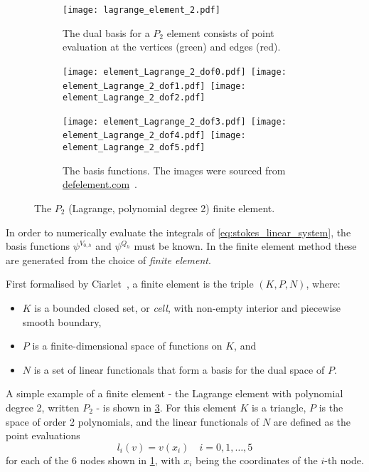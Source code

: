 \documentclass[thesis]{subfiles}
\begin{document}
\begin{figure}
  \centering
  \begin{subfigure}[b]{.4\textwidth}
    \centering
    \texttt{[image: lagrange\_element\_2.pdf]}
    \caption{
      The dual basis for a $P_2$ element consists of point evaluation at the vertices (green) and edges (red).
    }
    \label{fig:lagrange_element_2_dofs}
  \end{subfigure}
  \begin{subfigure}[b]{.58\textwidth}
    \centering
    \texttt{[image: element\_Lagrange\_2\_dof0.pdf]}\,%
    \texttt{[image: element\_Lagrange\_2\_dof1.pdf]}\,%
    \texttt{[image: element\_Lagrange\_2\_dof2.pdf]}

    \texttt{[image: element\_Lagrange\_2\_dof3.pdf]}\,%
    \texttt{[image: element\_Lagrange\_2\_dof4.pdf]}\,%
    \texttt{[image: element\_Lagrange\_2\_dof5.pdf]}
    \caption{
      The basis functions.
      The images were sourced from \href{https://defelement.com}{defelement.com}~\cite{defelement}.
    }
    \label{fig:lagrange_element_2_basis}
  \end{subfigure}

  \caption{The $P_2$ (Lagrange, polynomial degree 2) finite element.}
  \label{fig:lagrange_element_2}
\end{figure}

In order to numerically evaluate the integrals of \cref{eq:stokes_linear_system}, the basis functions $\psi^{V_{0,h}}$ and $\psi^{Q_h}$ must be known.
In the finite element method these are generated from the choice of \emph{finite element}.

First formalised by Ciarlet~\parencite{ciarletElement2002}, a finite element is the triple $(K, P, N)$, where:
\begin{itemize}
  \item $K$ is a bounded closed set, or \emph{cell}, with non-empty interior and piecewise smooth boundary,
  \item $P$ is a finite-dimensional space of functions on $K$, and
  \item $N$ is a set of linear functionals that form a basis for the dual space of $P$.
\end{itemize}

A simple example of a finite element - the Lagrange element with polynomial degree 2, written $P_2$ - is shown in \cref{fig:lagrange_element_2}.
For this element $K$ is a triangle, $P$ is the space of order 2 polynomials, and the linear functionals of $N$ are defined as the point evaluations
\begin{equation}
  l_i(v) = v(x_i)
  \quad
  i = 0,1,\dots,5
\end{equation}
for each of the 6 nodes shown in \cref{fig:lagrange_element_2_dofs}, with $x_i$ being the coordinates of the $i$-th node.
\end{document}

